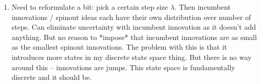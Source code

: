 \documentclass[12pt,english]{article}
\theoremstyle{remark}
\begin{document}
\begin{enumerate}
	\item Need to reformulate a bit: pick a certain step size $\lambda$. Then incumbent innovations / spinout ideas each have their own distribution over number of steps. Can eliminate uncertainty with incumbent innovation as it doesn't add anything. But no reason to *impose* that incumbent innovations are as small as the smallest spinout innovations. The problem with this is that it introduces more states in my discrete state space thing. But there is no way around this -- innovations are jumps. This state space is fundamentally discrete and it should be.
\end{enumerate}
\end{document}
